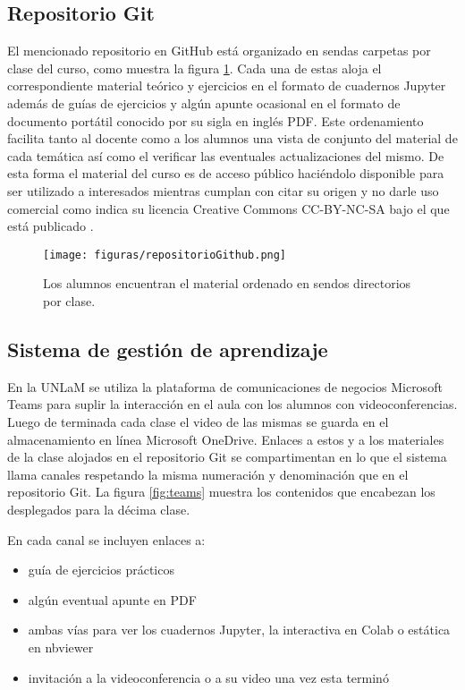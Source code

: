 \subsection{Repositorio Git}

El mencionado repositorio en GitHub está organizado en sendas carpetas por clase del curso, como muestra la figura \ref{fig:github}. Cada una de estas aloja el correspondiente material teórico y ejercicios en el formato de cuadernos Jupyter además de  guías de ejercicios y algún apunte ocasional en el formato de documento portátil conocido por su sigla en inglés PDF. Este ordenamiento facilita tanto al docente como a los alumnos una vista de conjunto del material de cada temática así como el verificar las eventuales actualizaciones del mismo. De esta forma el material del curso es de acceso público haciéndolo disponible para ser utilizado a interesados \cite{repositorio-victor} mientras cumplan con citar su origen y no darle uso comercial como indica su licencia Creative Commons CC-BY-NC-SA bajo el que está publicado \cite{creative}.

\begin{figure}[!ht]
\centering
\texttt{[image: figuras/repositorioGithub.png]}
\caption{Los alumnos encuentran el material ordenado en sendos directorios por clase.}
\label{fig:github}
\end{figure}

\subsection{Sistema de gestión de aprendizaje}

En la UNLaM se utiliza la plataforma de comunicaciones de negocios Microsoft Teams para suplir la interacción en el aula con los alumnos con videoconferencias. Luego de terminada cada clase el video de las mismas se guarda en el almacenamiento en línea Microsoft OneDrive. Enlaces a estos y a los materiales de la clase alojados en el repositorio Git se  compartimentan en lo que el sistema llama canales respetando la misma numeración y denominación que en el repositorio Git. La figura \ref{fig:teams} muestra los contenidos que encabezan los desplegados para la décima clase.

En cada canal se incluyen enlaces a:
\begin{itemize}
    \item guía de ejercicios prácticos
    \item algún eventual apunte en PDF
    \item ambas vías para ver los cuadernos Jupyter, la interactiva en Colab o estática en nbviewer
    \item invitación a la videoconferencia o a su video una vez esta terminó
\end{itemize}

